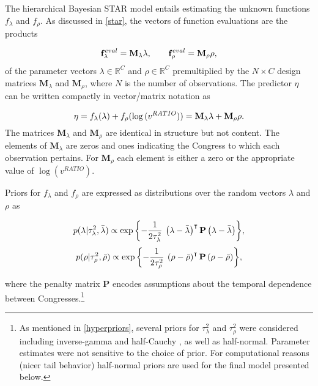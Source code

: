 The hierarchical Bayesian STAR model entails estimating the unknown functions $f_\lambda$ and $f_\rho$. As discussed in \ref{star}, the vectors of function evaluations are the products 

\begin{equation*}
\mathbf{f}^{eval}_\lambda = \mathbf{M}_\lambda \lambda, 
\qquad 
\mathbf{f}^{eval}_\rho =  \mathbf{M}_\rho \rho, 
\end{equation*}
%
\noindent of the parameter vectors $\lambda \in \mathbb{R}^C$ and $\rho \in \mathbb{R}^C$ premultiplied by the  $N \times C$ design matrices  $\mathbf{M}_\lambda$ and  $\mathbf{M}_\rho$, where $N$ is the number of observations. The predictor $\eta$ can be written compactly in vector/matrix notation as 

\begin{equation*}
 \eta = f_\lambda(\lambda) +  f_\rho(\log{(v^{RATIO})}) = \mathbf{M}_\lambda \lambda  + \mathbf{M}_\rho \rho.
\end{equation*}
\indent The matrices $\mathbf{M}_\lambda$ and $\mathbf{M}_\rho$ are identical in structure but not content. The elements of $\mathbf{M}_\lambda$ are zeros and ones indicating the Congress to which each observation pertains. For $\mathbf{M}_\rho$ each element is either a zero or the appropriate value of $\log{(v^{RATIO})}$. 


Priors for $f_{\lambda}$ and $f_{\rho}$ are expressed as distributions over the random vectors $\lambda$ and $\rho$ as 

\begin{equation*}
p(\lambda | \tau_\lambda^2, \bar{\lambda}) \propto \exp{\left\{-\frac{1}{2\tau_\lambda^2} \: \left(\lambda - \bar{\lambda}\right)^\intercal  \mathbf{P}   \left(\lambda - \bar{\lambda}\right) \right\}}, 
\end{equation*}
\begin{equation*}
p(\rho | \tau_\rho^2, \bar{\rho}) \propto \exp{\left\{-\frac{1}{2\tau_\rho^2} \: \left(\rho - \bar{\rho}\right)^\intercal  \mathbf{P} \left(\rho-\bar{\rho}\right) \right\}},
\end{equation*}

\noindent where the penalty matrix $\mathbf{P}$ encodes assumptions about the temporal dependence between Congresses.\footnote{As mentioned in \ref{hyperpriors}, several priors for $\tau^2_\lambda$ and $\tau^2_\rho$ were considered including inverse-gamma  and half-Cauchy , as well as half-normal. Parameter estimates were not sensitive to the choice of prior. For computational reasons (nicer tail behavior) half-normal priors are used for the final model presented below.}

